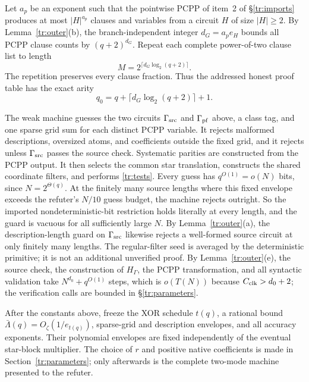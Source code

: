 \documentclass[11pt,letterpaper]{article}
\theoremstyle{definition}
\theoremstyle{remark}
\begin{document}
Let $a_p$ be an exponent such that the pointwise PCPP of item~2 of
\S\ref{tr:imports} produces at most $|H|^{a_p}$ clauses and variables
from a circuit $H$ of size $|H|\ge2$. By Lemma~\ref{tr:outer}(b), the
branch-independent integer $d_G=a_pe_H$ bounds all PCPP clause counts
by $(q+2)^{d_G}$. Repeat each complete power-of-two clause list to
length
\[
 M=2^{\lceil d_G\log_2(q+2)\rceil}.
\]
The repetition preserves every clause fraction. Thus the addressed
honest proof table has the exact arity
\begin{equation}
 q_0=q+\lceil d_G\log_2(q+2)\rceil+1.
 \label{tr:address-width}
\end{equation}

The weak machine guesses the two circuits $\Gamma_{\rm src}$ and
$\Gamma_{\rm pf}$ above, a class tag, and one sparse grid sum for each
distinct PCPP variable. It rejects malformed descriptions, oversized
atoms, and coefficients outside the fixed grid, and it rejects unless
$\Gamma_{\rm src}$ passes the source check. Systematic parities are
constructed from the PCPP output. It then selects the common star
translation, constructs the shared coordinate filters, and performs
\eqref{tr:tests}.
Every guess has $q^{O(1)}=o(N)$ bits, since $N=2^{\Theta(q)}$. At the
finitely many source lengths where this fixed envelope exceeds the
refuter's $N/10$ guess budget, the machine rejects outright. So the
imported nondeterministic-bit restriction holds literally at every
length, and the guard is vacuous for all sufficiently large $N$. By Lemma~\ref{tr:outer}(a), the description-length
guard on $\Gamma_{\rm src}$ likewise rejects a well-formed source
circuit at only finitely many lengths.
The regular-filter seed is averaged by the deterministic primitive;
it is not an additional unverified proof.
By Lemma~\ref{tr:outer}(e), the source check, the construction of
$H_\Gamma$, the PCPP transformation, and all syntactic validation take
$N^{d_0}+q^{O(1)}$ steps, which is $o(T(N))$ because
$C_{\rm clk}>d_0+2$; the verification calls are bounded in
\S\ref{tr:parameters}.

After the constants above, freeze the XOR schedule $t(q)$, a rational
bound $\bar\Lambda(q)=O_\zeta(1/e_{t(q)})$, sparse-grid and description
envelopes, and all accuracy exponents. Their polynomial envelopes are
fixed independently of the eventual star-block multiplier.
The choice of $r$ and positive native coefficients is made in
Section~\ref{tr:parameters}; only afterwards is the complete two-mode
machine presented to the refuter.
\end{document}
